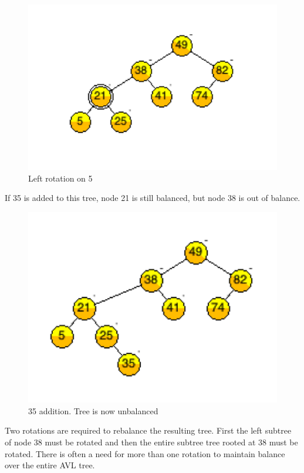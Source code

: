 \begin{figure}[H]
\centering
\includegraphics{pictures/tree8.png}
\caption{Left rotation on 5}
\label{fig:tree8}
\end{figure}

If 35 is added to this tree, node 21 is still balanced, but node 38 is out of balance.

\begin{figure}[H]
\centering
\includegraphics{pictures/tree9.png}
\caption{35 addition. Tree is now unbalanced}
\label{fig:tree9}
\end{figure}

Two rotations are required to rebalance the resulting tree. First the left subtree of node 38 must be rotated and then the entire subtree tree rooted at 38 must be rotated. There is often a need for more than one rotation to maintain balance over the entire AVL tree.


